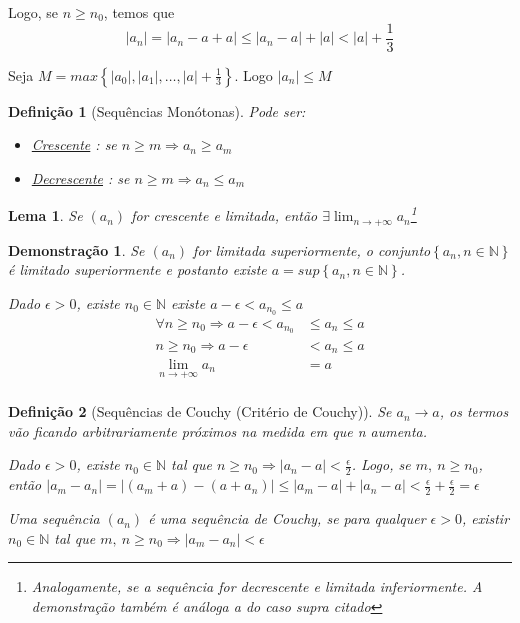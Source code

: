 \documentclass[12pt,openany]{book}
\newtheorem{lemma}{Lema}[section]
\newtheorem{definition}{Definição}[section]
\newtheorem{demonstration}{Demonstração}
\begin{document}
Logo, se $n \geq n_0$, temos que $$ |a_n| = |a_n - a + a| \leq |a_n - a| + |a| < |a| + \frac{1}{3}$$

Seja $M = max \left\{ |a_0|, |a_1|, \hdots , |a| +\frac{1}{3} \right\}$. Logo $|a_n| \leq M$

\begin{definition}[Sequências Monótonas]
\hspace{5mm} Pode ser:
\begin{itemize}
\item \underline{Crescente} : se $n \geq m \Rightarrow a_n \geq a_m $
\item \underline{Decrescente} : se $n \geq m \Rightarrow a_n \leq a_m $
\end{itemize}
\end{definition}

\begin{lemma}
Se $(a_n)$ for crescente e limitada, então $\displaystyle{\exists \lim_{n\rightarrow+\infty} a_n}$\footnote{Analogamente, se a sequência for decrescente e limitada inferiormente. A demonstração também é análoga a do caso supra citado}
\end{lemma}

\begin{demonstration}
Se $ (a_n) $ for limitada superiormente, o conjunto$\left\{a_n, n \in \mathds{N}\right\}$ é limitado superiormente e postanto existe $ a = sup \left\{a_n, n \in \mathds{N}\right\}$.

Dado $\epsilon > 0$, existe $n_0 \in \mathds{N}$ existe $a - \epsilon < a_{n_0} \leq a$
\begin{align*}
\forall n \geq n_0 \Rightarrow a - \epsilon < a_{n_0} &\leq a_n \leq a \\
n \geq n_0 \Rightarrow a - \epsilon &< a_n \leq a \\
\lim_{n \rightarrow +\infty} a_n &= a \\
\end{align*}
\end{demonstration}

\begin{definition}[Sequências de Couchy (Critério de Couchy)]
Se $a_n \rightarrow a$, os termos vão ficando arbitrariamente próximos na medida em que n aumenta. 

Dado $\epsilon > 0 $, existe $n_0 \in \mathds{N}$ tal que $n \geq n_0 \Rightarrow |a_n - a| < \frac{\epsilon}{2}$. Logo, se $m, \ n \geq n_0$, então $|a_m - a_n| = |(a_m + a) - (a + a_n)| \leq |a_m - a| + |a_n -a| < \displaystyle{\frac{\epsilon}{2}+\frac{\epsilon}{2}} = \epsilon$

Uma sequência $(a_n)$ é uma sequência de Couchy, se para qualquer $\epsilon > 0$, existir $n_0 \in \mathds{N}$ tal que $m, \ n \geq n_0 \Rightarrow |a_m - a_n| < \epsilon$
\end{definition}
\end{document}
